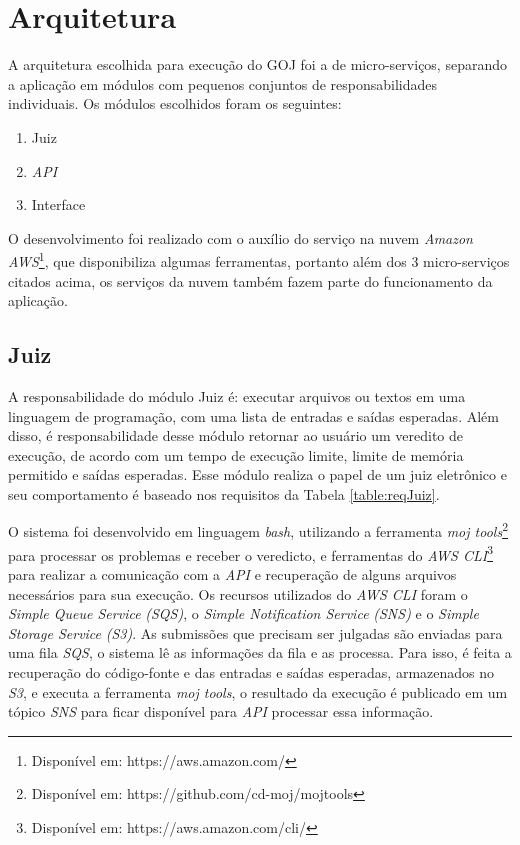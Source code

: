 \section{Arquitetura}
\label{sec:arquitetura}

A arquitetura escolhida para execução do GOJ foi a de micro-serviços, separando a aplicação em módulos com pequenos conjuntos de responsabilidades individuais. Os módulos escolhidos foram os seguintes:

\begin{enumerate}
    \item Juiz
    \item \textit{API} 
    \item Interface
\end{enumerate}

O desenvolvimento foi realizado com o auxílio do serviço na nuvem \textit{Amazon AWS}\footnote{Disponível em: https://aws.amazon.com/}, que disponibiliza algumas ferramentas, portanto além dos 3 micro-serviços citados acima, os serviços da nuvem também fazem parte do funcionamento da aplicação.

\subsection{Juiz} 
\label{subsec:juiz_arq}

A responsabilidade do módulo Juiz é: executar arquivos ou textos em uma linguagem de programação, com uma lista de entradas e saídas esperadas. Além disso, é responsabilidade desse módulo retornar ao usuário um veredito de execução, de acordo com um tempo de execução limite, limite de memória permitido e saídas esperadas. Esse módulo realiza o papel de um juiz eletrônico e seu comportamento é baseado nos requisitos da Tabela \ref{table:reqJuiz}.

O sistema foi desenvolvido em linguagem \textit{bash}, utilizando a ferramenta \textit{moj tools}\footnote{Disponível em: https://github.com/cd-moj/mojtools} para processar os problemas e receber o veredicto, e ferramentas do \textit{AWS CLI}\footnote{Disponível em: https://aws.amazon.com/cli/} para realizar a comunicação com a \textit{API} e recuperação de alguns arquivos necessários para sua execução. Os recursos utilizados do \textit{AWS CLI} foram o \textit{Simple Queue Service} \textit{(SQS)}, o \textit{Simple Notification Service} \textit{(SNS)} e o \textit{Simple Storage Service} \textit{(S3)}.
As submissões que precisam ser julgadas são enviadas para uma fila \textit{SQS}, o sistema lê as informações da fila e as processa. Para isso, é feita a recuperação do código-fonte e das entradas e saídas esperadas, armazenados no \textit{S3}, e executa a ferramenta \textit{moj tools}, o resultado da execução é publicado em um tópico \textit{SNS} para ficar disponível para \textit{API} processar essa informação.

